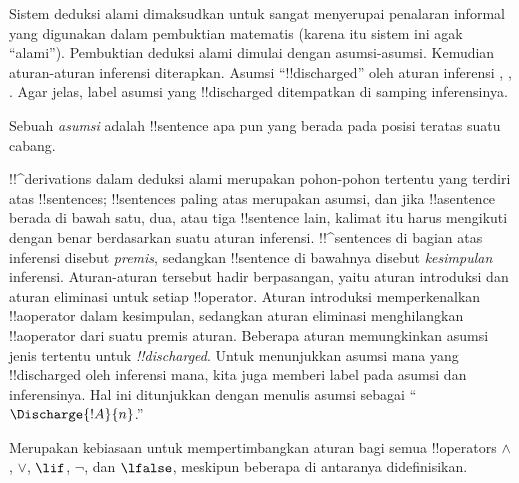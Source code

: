 \documentclass[../../../include/open-logic-section]{subfiles}
\begin{document}
      {}
      {}


\begin{explain}
Sistem deduksi alami dimaksudkan untuk sangat menyerupai penalaran
informal yang digunakan dalam pembuktian matematis (karena itu sistem
ini agak ``alami''). Pembuktian deduksi alami dimulai dengan
asumsi-asumsi. Kemudian aturan-aturan inferensi diterapkan. Asumsi
``!!{discharged}'' oleh aturan inferensi \Intro{\lnot}, \Intro{\lif},
. Agar
jelas, label asumsi yang !!{discharged} ditempatkan di samping
inferensinya.
\end{explain}

\begin{defn}[Asumsi]
Sebuah \emph{asumsi} adalah !!{sentence} apa pun yang berada pada
posisi teratas suatu cabang.
\end{defn}

!!^{derivation}s dalam deduksi alami merupakan pohon-pohon tertentu
yang terdiri atas !!{sentence}s; !!{sentence}s paling atas merupakan
asumsi, dan jika !!a{sentence} berada di bawah satu, dua, atau tiga
!!{sentence} lain, kalimat itu harus mengikuti dengan benar berdasarkan
suatu aturan inferensi. !!^{sentence}s di bagian atas inferensi disebut
\emph{premis}, sedangkan !!{sentence} di bawahnya disebut
\emph{kesimpulan} inferensi. Aturan-aturan tersebut hadir berpasangan,
yaitu aturan introduksi dan aturan eliminasi untuk setiap
!!{operator}. Aturan introduksi memperkenalkan !!a{operator} dalam
kesimpulan, sedangkan aturan eliminasi menghilangkan !!a{operator} dari
suatu premis aturan. Beberapa aturan memungkinkan asumsi jenis tertentu
untuk \emph{!!{discharged}}. Untuk menunjukkan asumsi mana yang
!!{discharged} oleh inferensi mana, kita juga memberi label pada asumsi
dan inferensinya. Hal ini ditunjukkan dengan menulis asumsi sebagai
``$\Discharge{!A}{n}$.''


%
	{Merupakan kebiasaan untuk mempertimbangkan aturan bagi semua !!{operator}s $\land$, $\lor$, $\lif$, $\lnot$, dan $\lfalse$, meskipun beberapa di antaranya didefinisikan.}
\end{document}
